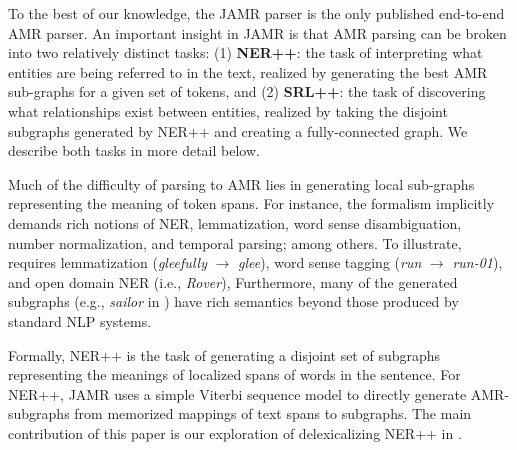 \documentclass[11pt]{article}
\begin{document}

To the best of our knowledge, the JAMR parser is
the only published end-to-end AMR parser.
An important insight in JAMR is that AMR parsing can be broken into two 
relatively distinct tasks: (1) \textbf{NER++}: the task of interpreting what entities are being referred to in 
the text, realized by generating the best AMR sub-graphs for a given set of tokens, and
(2) \textbf{SRL++}: the task of discovering what 
relationships exist between entities, realized by taking the disjoint subgraphs generated
  by NER++ and creating a fully-connected graph.
We describe both tasks in more detail below.


Much of the difficulty of parsing to AMR lies in generating local sub-graphs representing the meaning of token spans.
For instance, the formalism implicitly demands rich notions of NER, lemmatization, word sense disambiguation, number normalization, and temporal parsing; among others.
To illustrate,  requires lemmatization (\textit{gleefully} $\rightarrow$ \textit{glee}), word sense tagging (\textit{run} $\rightarrow$ \textit{run-01}), and open domain NER (i.e., \textit{Rover}),
Furthermore, many of the generated subgraphs (e.g., \textit{sailor} in ) have rich semantics beyond those produced by standard NLP systems.

Formally, NER++ is the task of generating a disjoint set of subgraphs representing the meanings of localized spans of words in the sentence.
For NER++, JAMR uses a simple Viterbi sequence model to directly generate AMR-subgraphs from memorized mappings of text spans to subgraphs. The main contribution of this paper is our exploration of delexicalizing NER++ in .
\end{document}

